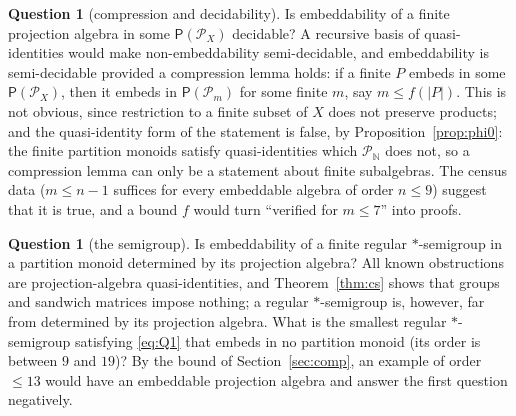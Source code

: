 \documentclass[11pt]{amsart}
\theoremstyle{definition}
\newtheorem{question}[theorem]{Question}
\renewcommand{\P}{\mathcal{P}}      %
\newcommand{\PA}{\mathsf{P}}         %
\begin{document}
\begin{question}[compression and decidability]\label{q:decidable}
Is embeddability of a finite projection algebra in some $\PA(\P_X)$ decidable? A recursive basis of quasi-identities would make non-embeddability semi-decidable, and embeddability is semi-decidable provided a compression lemma holds: if a finite $P$ embeds in some $\PA(\P_X)$, then it embeds in $\PA(\P_m)$ for some finite $m$, say $m\le f(|P|)$. This is not obvious, since restriction to a finite subset of $X$ does not preserve products; and the quasi-identity form of the statement is false, by Proposition~\ref{prop:phi0}: the finite partition monoids satisfy quasi-identities which $\P_{\mathbb N}$ does not, so a compression lemma can only be a statement about finite subalgebras. The census data ($m\le n-1$ suffices for every embeddable algebra of order $n\le9$) suggest that it is true, and a bound $f$ would turn ``verified for $m\le7$'' into proofs.
\end{question}

\begin{question}[the semigroup]\label{q:pa}
Is embeddability of a finite regular $*$-semigroup in a partition monoid determined by its projection algebra? All known obstructions are projection-algebra quasi-identities, and Theorem~\ref{thm:cs} shows that groups and sandwich matrices impose nothing; a regular $*$-semigroup is, however, far from determined by its projection algebra. What is the smallest regular $*$-semigroup satisfying \eqref{eq:Q1} that embeds in no partition monoid (its order is between $9$ and $19$)? By the bound of Section~\ref{sec:comp}, an example of order $\le13$ would have an embeddable projection algebra and answer the first question negatively.
\end{question}
\end{document}
